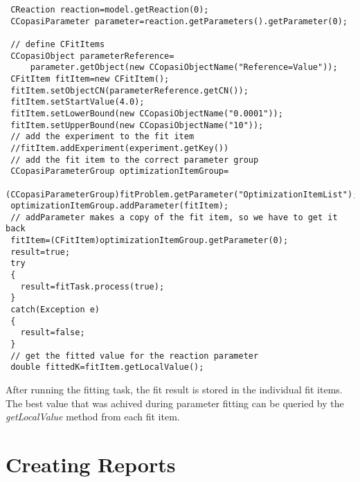 \documentclass[a4,10pt]{article}
\begin{document}
\begin{lstlisting}
 CReaction reaction=model.getReaction(0);
 CCopasiParameter parameter=reaction.getParameters().getParameter(0);
 
 // define CFitItems
 CCopasiObject parameterReference=
     parameter.getObject(new CCopasiObjectName("Reference=Value"));
 CFitItem fitItem=new CFitItem();
 fitItem.setObjectCN(parameterReference.getCN());
 fitItem.setStartValue(4.0);
 fitItem.setLowerBound(new CCopasiObjectName("0.0001"));
 fitItem.setUpperBound(new CCopasiObjectName("10"));
 // add the experiment to the fit item
 //fitItem.addExperiment(experiment.getKey())
 // add the fit item to the correct parameter group
 CCopasiParameterGroup optimizationItemGroup=
     (CCopasiParameterGroup)fitProblem.getParameter("OptimizationItemList");
 optimizationItemGroup.addParameter(fitItem);
 // addParameter makes a copy of the fit item, so we have to get it back
 fitItem=(CFitItem)optimizationItemGroup.getParameter(0);
 result=true;
 try
 {
   result=fitTask.process(true);
 }
 catch(Exception e)
 {
   result=false;
 }
 // get the fitted value for the reaction parameter
 double fittedK=fitItem.getLocalValue();
\end{lstlisting}

After running the fitting task, the fit result is stored in the individual fit items. The best value that was achived during parameter fitting can be queried by the \textit{getLocalValue} method from each fit item.

\section{Creating Reports}
\label{CreatingReports}
\end{document}
